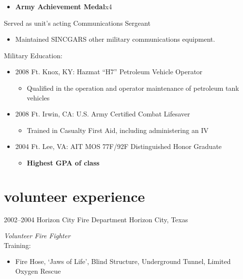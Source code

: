 \documentclass[]{friggeri-cv} %
\begin{document}
\begin{entrylist}
{\begin{itemize}
\item \textbf{Army Achievement Medal}x4
\end{itemize}
Served as unit's acting Communications Sergeant
\begin{itemize}
\item Maintained SINCGARS other military communications equipment.
\end{itemize}
Military Education:
\begin{itemize}
\item 2008 Ft. Knox, KY: Hazmat “H7” Petroleum Vehicle Operator
\begin{itemize}
\item Qualified in the operation and operator maintenance of petroleum tank vehicles
\end{itemize}
\item 2008 Ft. Irwin, CA: U.S. Army Certified Combat Lifesaver
\begin{itemize}
\item Trained in Casualty First Aid, including administering an IV
\end{itemize}
\item 2004 Ft. Lee, VA: AIT MOS 77F/92F Distinguished Honor Graduate
\begin{itemize}
\item \textbf{Highest GPA of class}
\end{itemize}
\end{itemize}}
\end{entrylist}



\section{volunteer experience}

\begin{entrylist}
\entry
{2002--2004}
{Horizon City Fire Department}
{Horizon City, Texas}
{\emph{Volunteer Fire Fighter} \\
Training:
\begin{itemize}
\item Fire Hose, ‘Jaws of Life’, Blind Structure, Underground Tunnel, Limited Oxygen Rescue
\end{itemize}}
\end{entrylist}
\end{document}
